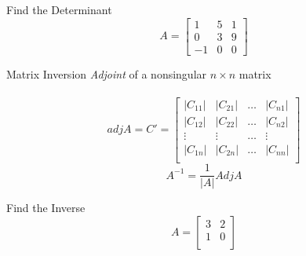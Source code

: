 \documentclass{./../../Latex/teaching_slides}
\begin{document}
\begin{frame}{Find the Determinant}
\[
A=\left[\begin{array}{ccc}
1 & 5 & 1 \\
0 & 3 & 9 \\
-1 & 0 & 0
\end{array}\right]
\]
 \end{frame}


 
% 
\begin{frame}{Matrix Inversion}
 \textit{Adjoint} of a nonsingular $n \times n$ matrix \\~\\
 $$adj A = C' = \left[\begin{array}{llll}
|C_{11}| & |C_{21}| & \hdots & |C_{n1}| \\
|C_{12}| & |C_{22}| & \hdots &  |C_{n2}| \\
\vdots &\vdots & \hdots &  \vdots \\
|C_{1n}| & |C_{2n}| & \hdots & |C_{nn}| \\
\end{array}\right]$$
\vspace{1em}
$$ A^{-1} = \frac{1}{|A|} Adj A$$
 \end{frame}

\begin{frame}{Find the Inverse}
$$
A=\left[\begin{array}{ccc}
3 & 2 \\
1 & 0 \\
\end{array}\right]
$$
 \end{frame}
\end{document}
